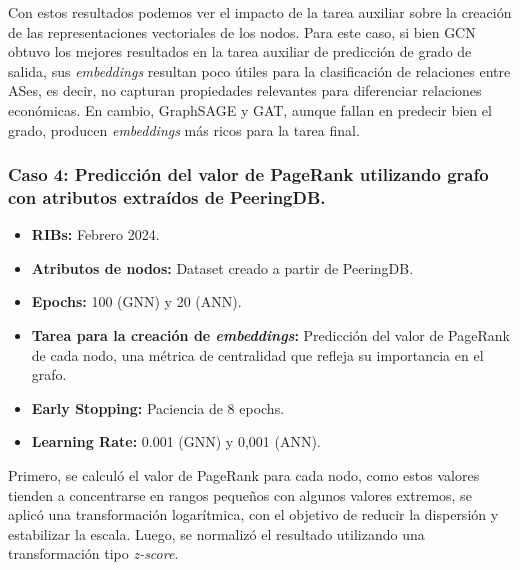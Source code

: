 Con estos resultados podemos ver el impacto de la tarea auxiliar sobre la creación de las representaciones vectoriales de los nodos. Para este caso, si bien GCN obtuvo los mejores resultados en la tarea auxiliar de predicción de grado de salida, sus \textit{embeddings} resultan poco útiles para la clasificación de relaciones entre ASes, 
es decir, no capturan propiedades relevantes para diferenciar relaciones económicas. En cambio, GraphSAGE y GAT, aunque fallan en predecir bien el grado, producen \textit{embeddings} más ricos para la tarea final.\\ 



\subsubsection{Caso 4: Predicción del valor de PageRank utilizando grafo con atributos extraídos de PeeringDB.}

\begin{itemize}
    \item \textbf{RIBs:} Febrero 2024.
    \item \textbf{Atributos de nodos:} Dataset creado a partir de PeeringDB.
    \item \textbf{Epochs:} 100 (GNN) y 20 (ANN).
    \item \textbf{Tarea para la creación de \textit{embeddings}:} Predicción del valor de PageRank de cada nodo, una métrica de centralidad que refleja su importancia en el grafo.
    \item \textbf{Early Stopping:} Paciencia de 8 epochs.
    \item \textbf{Learning Rate:} 0.001 (GNN) y 0,001 (ANN).
\end{itemize}



Primero, se calculó el valor de PageRank para cada nodo, como estos valores tienden a concentrarse en rangos pequeños con algunos valores extremos, se aplicó una transformación logarítmica, con el objetivo de reducir la dispersión y estabilizar la escala. Luego, se normalizó el resultado utilizando una transformación tipo \textit{z-score}.\\







